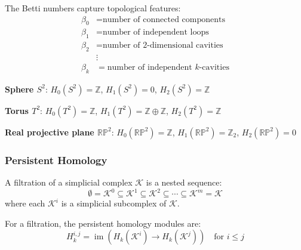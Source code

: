 \begin{remark}\label{rem:interpretacion_betti}
The Betti numbers capture topological features:
\begin{align}
    \beta_0 &= \text{number of connected components} \\
    \beta_1 &= \text{number of independent loops} \\
    \beta_2 &= \text{number of 2-dimensional cavities} \\
    &\vdots \\
    \beta_k &= \text{number of independent } k\text{-cavities}
\end{align}
\end{remark}

\begin{example}\label{ex:homologia_basicas}
\textbf{Sphere $S^2$}: $H_0(S^2) = \mathbb{Z}$, $H_1(S^2) = 0$, $H_2(S^2) = \mathbb{Z}$

\textbf{Torus $T^2$}: $H_0(T^2) = \mathbb{Z}$, $H_1(T^2) = \mathbb{Z} \oplus \mathbb{Z}$, $H_2(T^2) = \mathbb{Z}$

\textbf{Real projective plane $\mathbb{RP}^2$}: $H_0(\mathbb{RP}^2) = \mathbb{Z}$, $H_1(\mathbb{RP}^2) = \mathbb{Z}_2$, $H_2(\mathbb{RP}^2) = 0$
\end{example}

\subsubsection{Persistent Homology}

\begin{definition}[Filtration]\label{def:filtracion}
A filtration of a simplicial complex $\mathcal{K}$ is a nested sequence:
\begin{equation}
    \emptyset = \mathcal{K}^0 \subseteq \mathcal{K}^1 \subseteq \mathcal{K}^2 \subseteq \cdots \subseteq \mathcal{K}^m = \mathcal{K}
\end{equation}
where each $\mathcal{K}^i$ is a simplicial subcomplex of $\mathcal{K}$.
\end{definition}

\begin{definition}\label{def:modulos_homologia_persistente}
For a filtration, the persistent homology modules are:
\begin{equation}
    H_k^{i,j} = \operatorname{im}(H_k(\mathcal{K}^i) \to H_k(\mathcal{K}^j)) \quad \text{for } i \leq j
\end{equation}
\end{definition}

